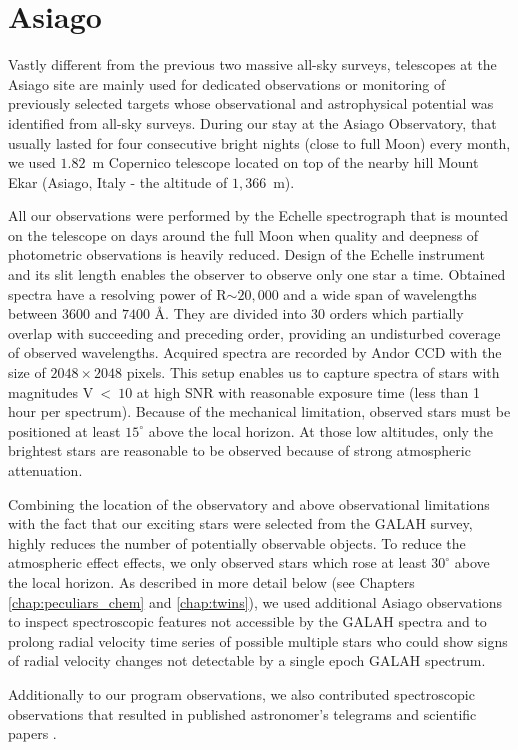 \begin{itemize}
\end{itemize}

\section{Asiago}
\label{sec:asiago_data}
Vastly different from the previous two massive all-sky surveys, telescopes at the Asiago site are mainly used for dedicated observations or monitoring of previously selected targets whose observational and astrophysical potential was identified from all-sky surveys. During our stay at the Asiago Observatory, that usually lasted for four consecutive bright nights (close to full Moon) every month, we used $1.82$~m Copernico telescope located on top of the nearby hill Mount Ekar (Asiago, Italy - the altitude of $1,366$~m).

All our observations were performed by the Echelle spectrograph that is mounted on the telescope on days around the full Moon when quality and deepness of photometric observations is heavily reduced. Design of the Echelle instrument and its slit length enables the observer to observe only one star a time. Obtained spectra have a resolving power of R$\sim20,000$ and a wide span of wavelengths between $3600$ and $7400$ \AA. They are divided into 30 orders which partially overlap with succeeding and preceding order, providing an undisturbed coverage of observed wavelengths. Acquired spectra are recorded by Andor CCD with the size of $2048 \times 2048$ pixels. This setup enables us to capture spectra of stars with magnitudes V~<~$10$ at high SNR with reasonable exposure time (less than 1 hour per spectrum). Because of the mechanical limitation, observed stars must be positioned at least $15^\circ$ above the local horizon. At those low altitudes, only the brightest stars are reasonable to be observed because of strong atmospheric attenuation.

Combining the location of the observatory and above observational limitations with the fact that our exciting stars were selected from the GALAH survey, highly reduces the number of potentially observable objects. To reduce the atmospheric effect effects, we only observed stars which rose at least $30^\circ$ above the local horizon. As described in more detail below (see Chapters \ref{chap:peculiars_chem} and \ref{chap:twins}), we used additional Asiago observations to inspect spectroscopic features not accessible by the GALAH spectra and to prolong radial velocity time series of possible multiple stars who could show signs of radial velocity changes not detectable by a single epoch GALAH spectrum.

Additionally to our program observations, we also contributed spectroscopic observations that resulted in published astronomer's telegrams \citep{2019ATel13340....1M} and scientific papers \citep{2019MNRAS.488.5536M}.